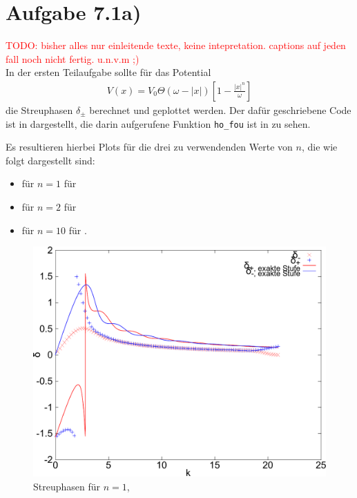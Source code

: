 \section*{Aufgabe 7.1a)}
\Huge \textcolor{red}{TODO: bisher alles nur einleitende texte, keine intepretation.
captions auf jeden fall noch nicht fertig. u.n.v.m ;)\\}
\normalsize
In der ersten Teilaufgabe sollte für das Potential
\begin{eqnarray}
V(x) = V_0 \Theta(ω-|x|)\left[ 1-\frac{|x|^n}{ω} \right]
\end{eqnarray}
die Streuphasen $δ_{\pm}$ berechnet und geplottet werden. Der dafür geschriebene
Code ist in  dargestellt, die darin aufgerufene Funktion \texttt{ho\_fou}
ist in  zu sehen.




Es resultieren hierbei Plots für die drei zu verwendenden Werte von $n$, die wie
folgt dargestellt sind:
\begin{itemize}
\item für $n=1$ für 
\item für $n=2$ für 
\item für $n=10$ für .
\end{itemize}

\begin{figure}[htb]
  \centering
  \includegraphics[width=0.8\columnwidth,keepaspectratio]{../tmp/71a_n1-crop}
  \caption{Streuphasen für $n=1$, }
  \label{fig:n1}
\end{figure}

